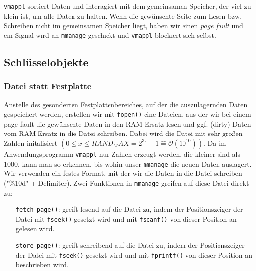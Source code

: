 \documentclass[
   draft=false
  ,paper=a4
  ,twoside=false
  ,fontsize=11pt
  ,headsepline
  ,BCOR10mm
  ,DIV11
  ,parskip=full+
]{scrartcl} %
\begin{document}
        \texttt{vmappl} sortiert Daten und interagiert mit dem gemeinsamen 
        Speicher, der viel zu klein ist, um alle Daten zu halten. Wenn die 
        gewünschte Seite zum Lesen bzw. Schreiben nicht im gemeinsamen 
        Speicher liegt, haben wir einen \textit{page fault} und ein Signal 
        wird an \texttt{mmanage} geschickt und \texttt{vmappl} blockiert sich
        selbst.

    \subsection{Schlüsselobjekte}

        \subsubsection{Datei statt Festplatte}
        Anstelle des gesonderten Festplattenbereiches, auf der die 
        auszulagernden Daten gespeichert werden, erstellen wir mit \texttt{fopen()}
        eine Dateien, aus der wir bei einem page fault die gewünschte Daten 
        in den RAM-Ersatz lesen und ggf. (dirty) Daten vom RAM Ersatz in die 
        Datei schreiben. Dabei wird die Datei mit sehr großen Zahlen initalisiert
        $( 0 \leq x \leq RAND_MAX = 2^{32}-1 \widehat{=} \mathcal{O}(10^{10}))$.
        Da im Anwendungsprogramm \texttt{vmappl} nur Zahlen erzeugt werden, 
        die kleiner sind als 1000, kann man so erkennen, bis wohin unser 
        \texttt{mmanage} die neuen Daten auslagert. Wir verwenden ein festes 
        Format, mit der wir die Daten in die Datei schreiben ("{}\%10d"{} + 
        Delimiter). Zwei Funktionen in \texttt{mmanage} greifen auf diese
        Datei direkt zu: 
        \begin{itemize}
                \item[\texttt{fetch\_page()}:] greift lesend auf die Datei zu,
                indem der Positionszeiger der Datei mit \texttt{fseek()} 
                gesetzt wird und mit \texttt{fscanf()} von dieser Position an 
                gelesen wird.
                \item[\texttt{store\_page()}:] greift schreibend auf die Datei zu,
                indem der Positionszeiger der Datei mit \texttt{fseek()} 
                gesetzt wird und mit \texttt{fprintf()} von dieser Position an
                beschrieben wird.
        \end{itemize}
\end{document}
